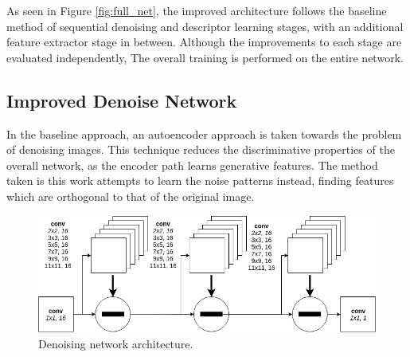 \documentclass[10pt,twocolumn,letterpaper]{article}
\begin{document}
As seen in Figure \ref{fig:full_net}, the improved architecture follows the baseline method of sequential denoising and descriptor learning stages, with an additional feature extractor stage in between. Although the improvements to each stage are evaluated independently, The overall training is performed on the entire network.





\subsection{Improved Denoise Network}
In the baseline approach, an autoencoder approach is taken towards the problem of denoising images. This technique reduces the discriminative properties of the overall network, as the encoder path learns generative features. The method taken is this work attempts to learn the noise patterns instead, finding features which are orthogonal to that of the original image.

\begin{figure}[H]
\centering
  \includegraphics[width=0.99\linewidth]{report/figures/denoise_net_horizontal.png}
  \caption{Denoising network architecture.}
  \label{fig:denoise_net}
\end{figure}
\end{document}
